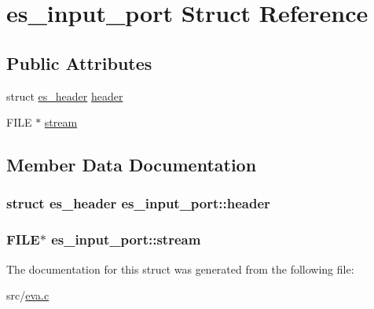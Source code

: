 \hypertarget{structes__input__port}{\section{es\-\_\-input\-\_\-port Struct Reference}
\label{structes__input__port}
}
\subsection*{Public Attributes}
\begin{DoxyCompactItemize}
\item 
struct \hyperlink{structes__header}{es\-\_\-header} \hyperlink{structes__input__port_a64e6a0e7f553938513f92ec18bc6ba33}{header}
\item 
F\-I\-L\-E $\ast$ \hyperlink{structes__input__port_a3e6352a800af318725190ee8076d95fe}{stream}
\end{DoxyCompactItemize}


\subsection{Member Data Documentation}
\hypertarget{structes__input__port_a64e6a0e7f553938513f92ec18bc6ba33}{
\subsubsection[{header}]{\setlength{\rightskip}{0pt plus 5cm}struct {\bf es\-\_\-header} es\-\_\-input\-\_\-port\-::header}}\label{structes__input__port_a64e6a0e7f553938513f92ec18bc6ba33}
\hypertarget{structes__input__port_a3e6352a800af318725190ee8076d95fe}{
\subsubsection[{stream}]{\setlength{\rightskip}{0pt plus 5cm}F\-I\-L\-E$\ast$ es\-\_\-input\-\_\-port\-::stream}}\label{structes__input__port_a3e6352a800af318725190ee8076d95fe}


The documentation for this struct was generated from the following file\-:\begin{DoxyCompactItemize}
\item 
src/\hyperlink{eva_8c}{eva.\-c}\end{DoxyCompactItemize}
